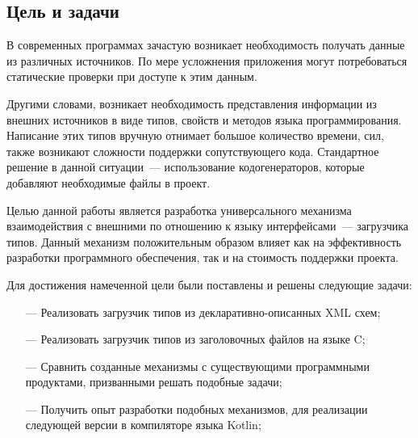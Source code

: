 \subsection{Цель и задачи}\label{tasks}

В современных программах зачастую возникает необходимость получать данные из различных источников.
По мере усложнения приложения могут потребоваться статические проверки при доступе к этим данным.

Другими словами, возникает необходимость представления информации из внешних источников в виде типов, свойств и методов языка программирования.
Написание этих типов вручную отнимает большое количество времени, сил, также возникают сложности поддержки сопутствующего кода.
Стандартное решение в данной ситуации~--- использование кодогенераторов, которые добавляют необходимые файлы в проект.

Целью данной работы является разработка универсального механизма взаимодействия с внешними по отношению к языку интерфейсами~--- загрузчика типов.
Данный механизм положительным образом влияет как на эффективность разработки программного обеспечения, так и на стоимость поддержки проекта.

Для достижения намеченной цели были поставлены и решены следующие задачи:
\begin{itemize}
\item[---] Реализовать загрузчик типов из декларативно-описанных XML схем;
\item[---] Реализовать загрузчик типов из заголовочных файлов на языке C;
\item[---] Сравнить созданные механизмы с существующими программными продуктами, призванными решать подобные задачи;
\item[---] Получить опыт разработки подобных механизмов, для реализации следующей версии в компиляторе языка Kotlin;
\end{itemize}